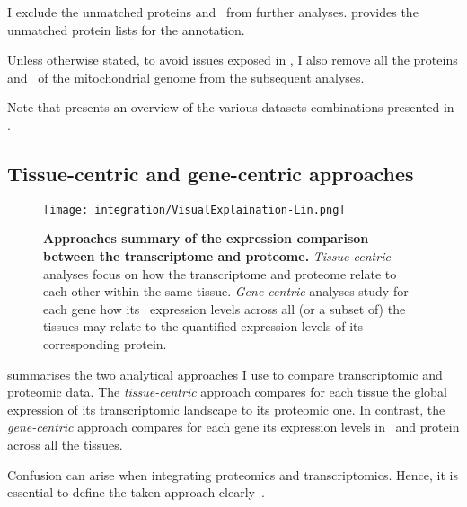 I exclude the unmatched proteins and \mRNAs\ from further analyses.
 provides the unmatched protein lists
for the  annotation.\mybr\

Unless otherwise stated, to avoid issues exposed in ,
I also remove all the proteins and \mRNAs\ of the mitochondrial genome
from the subsequent analyses.

Note that  presents
an overview of the various datasets combinations presented
in .

\subsection{Tissue-centric and gene-centric approaches}

\begin{figure}[!ht]
    \texttt{[image: integration/VisualExplaination-Lin.png]}\centering
    \caption[Summary of the expression comparison approaches between
    the transcriptome and proteome]{\label{fig:visualexp}\textbf{Approaches
    summary of the expression comparison between the transcriptome and proteome.}
    \emph{Tissue-centric} analyses focus on
    how the transcriptome and proteome relate to each other within the same tissue.
    \emph{Gene-centric} analyses study for each gene how its \mRNA\ expression
    levels across all (or a subset of) the tissues may relate to
    the quantified expression levels of its corresponding protein.
    }
\end{figure}

 summarises the two analytical approaches I use
to compare transcriptomic and proteomic data.
The \emph{tissue-centric} approach compares for each tissue
the global expression of its transcriptomic landscape to its proteomic one.
In contrast,
the \emph{gene-centric} approach compares for each gene
its expression levels in \mRNA\ and protein across all the tissues.

Confusion can arise
when integrating proteomics and transcriptomics.
Hence, it is essential
to define the taken approach clearly~.\mybr\
\vspace{-2mm}

